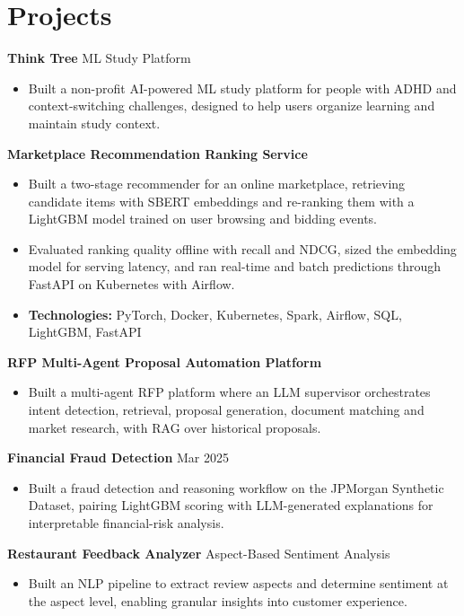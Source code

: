 \documentclass[10pt,a4paper]{article}
\begin{document}
\section{Projects}
\textbf{Think Tree} \textbar{} ML Study Platform\par
\begin{itemize}
  \item Built a non-profit AI-powered ML study platform for people with ADHD and context-switching challenges, designed to help users organize learning and maintain study context.
\end{itemize}
\textbf{Marketplace Recommendation Ranking Service}\par
\begin{itemize}
  \item Built a two-stage recommender for an online marketplace, retrieving candidate items with SBERT embeddings and re-ranking them with a LightGBM model trained on user browsing and bidding events.
  \item Evaluated ranking quality offline with recall and NDCG, sized the embedding model for serving latency, and ran real-time and batch predictions through FastAPI on Kubernetes with Airflow.
  \item \textbf{Technologies:} PyTorch, Docker, Kubernetes, Spark, Airflow, SQL, LightGBM, FastAPI
\end{itemize}
\textbf{RFP Multi-Agent Proposal Automation Platform}\par
\begin{itemize}
  \item Built a multi-agent RFP platform where an LLM supervisor orchestrates intent detection, retrieval, proposal generation, document matching and market research, with RAG over historical proposals.
\end{itemize}
\textbf{Financial Fraud Detection} \textbar{} Mar 2025\par
\begin{itemize}
  \item Built a fraud detection and reasoning workflow on the JPMorgan Synthetic Dataset, pairing LightGBM scoring with LLM-generated explanations for interpretable financial-risk analysis.
\end{itemize}
\textbf{Restaurant Feedback Analyzer} \textbar{} Aspect-Based Sentiment Analysis\par
\begin{itemize}
  \item Built an NLP pipeline to extract review aspects and determine sentiment at the aspect level, enabling granular insights into customer experience.
\end{itemize}
\end{document}
